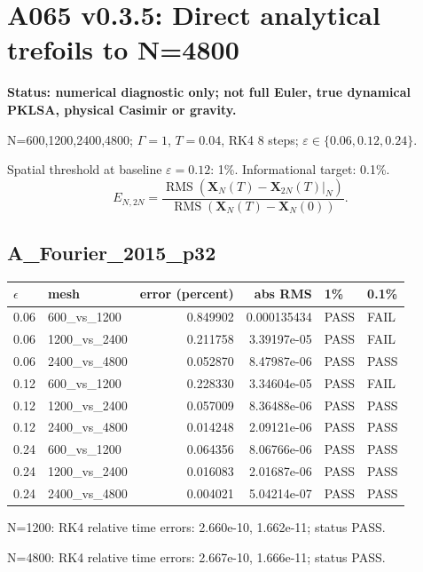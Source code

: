 \documentclass[10pt,a4paper]{article}
\begin{document}
\section*{A065 v0.3.5: Direct analytical trefoils to N=4800}
\textbf{Status: numerical diagnostic only; not full Euler, true dynamical PKLSA, physical Casimir or gravity.}
\par N=600,1200,2400,4800; $\Gamma=1$, $T=0.04$, RK4 8 steps; $\varepsilon\in\{0.06,0.12,0.24\}$.
\par Spatial threshold at baseline $\varepsilon=0.12$: 1\%. Informational target: 0.1\%.
\[ E_{N,2N}=\frac{\operatorname{RMS}(\mathbf X_N(T)-\mathbf X_{2N}(T)|_N)}{\operatorname{RMS}(\mathbf X_N(T)-\mathbf X_N(0))}.\]
\subsection*{A\_Fourier\_2015\_p32}
\begin{longtable}{@{}llrrll@{}}\toprule $\epsilon$ & mesh & error (percent) & abs RMS & 1\% & 0.1\%\\\midrule
0.06 & 600\_vs\_1200 & 0.849902 & 0.000135434 & PASS & FAIL\\
0.06 & 1200\_vs\_2400 & 0.211758 & 3.39197e-05 & PASS & FAIL\\
0.06 & 2400\_vs\_4800 & 0.052870 & 8.47987e-06 & PASS & PASS\\
0.12 & 600\_vs\_1200 & 0.228330 & 3.34604e-05 & PASS & FAIL\\
0.12 & 1200\_vs\_2400 & 0.057009 & 8.36488e-06 & PASS & PASS\\
0.12 & 2400\_vs\_4800 & 0.014248 & 2.09121e-06 & PASS & PASS\\
0.24 & 600\_vs\_1200 & 0.064356 & 8.06766e-06 & PASS & PASS\\
0.24 & 1200\_vs\_2400 & 0.016083 & 2.01687e-06 & PASS & PASS\\
0.24 & 2400\_vs\_4800 & 0.004021 & 5.04214e-07 & PASS & PASS\\
\bottomrule\end{longtable}
\par N=1200: RK4 relative time errors: 2.660e-10, 1.662e-11; status PASS.
\par N=4800: RK4 relative time errors: 2.667e-10, 1.666e-11; status PASS.
\end{document}
